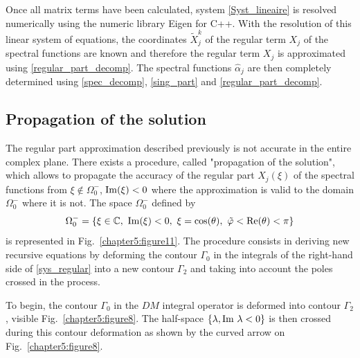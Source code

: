 Once all matrix terms have been calculated, system \eqref{Syst_lineaire} is resolved numerically using the numeric library Eigen for C++. With the resolution of this linear system of equations, the coordinates $\tilde{X}_j^k$ of the regular term $X_j$ of the spectral functions are known and therefore the regular term $X_j$ is approximated using \eqref{regular_part_decomp}. The spectral functions $\hat{\alpha}_j$ are then completely determined using \eqref{spec_decomp}, \eqref{sing_part} and \eqref{regular_part_decomp}. 

\subsection{Propagation of the solution}
\label{propag_sol}
The regular part approximation described previously is not accurate in the entire complex plane. There exists a procedure, called "propagation of the solution", which allows to propagate the accuracy of the regular part $X_j(\xi)$ of the spectral functions from $\xi \notin \Omega_0^-$, ${\rm Im} (\xi) <0$ where the approximation is valid to the domain $\Omega_0^-$ where it is not. The space $\Omega_0^-$ defined by
\begin{equation}
\label{defomegamoins}
\Omega_0^- = \{\xi \in \mathbb C, \ {\rm Im}(\xi) <0, \  \xi=\cos(\theta), \ \tilde{\varphi} < {\rm Re}(\theta)<\pi\}
\end{equation}
is represented in Fig.~\ref{chapter5:figure11}. 
The procedure consists in deriving new recursive equations by deforming the  contour $\Gamma_0$ in the integrals of the right-hand side of \eqref{sys_regular} into a new contour $\Gamma_2$ and taking into account the poles crossed in the process.

To begin, the contour $\Gamma_0$ in the $DM$ integral operator is deformed into contour $\Gamma_2$, visible Fig.~\ref{chapter5:figure8}. The half-space $\{ \lambda, {\rm Im} \ \lambda < 0 \}$ is then crossed during this contour deformation as shown by the curved arrow on Fig.~\ref{chapter5:figure8}.


